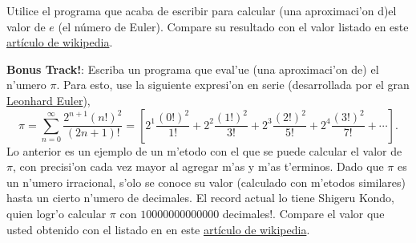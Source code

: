 \documentclass[11pt]{exam}
\begin{document}
\begin{questions}
\item Utilice el programa que acaba de escribir para calcular (una aproximaci'on d)el valor de $e$ (el n\'umero de Euler). Compare su resultado con el valor listado en este \href{https://es.wikipedia.org/wiki/N\%C3\%BAmero_e}{art\'iculo de wikipedia}.

\item \textbf{Bonus Track!}: Escriba un programa que eval'ue (una aproximaci'on de) el n'umero $\pi$. Para esto, use la siguiente expresi'on en serie (desarrollada por el gran \href{https://es.wikipedia.org/wiki/Leonhard_Euler}{Leonhard Euler}),
\begin{equation}
\pi = \sum_{n=0}^{\infty}\frac{2^{n+1}(n!)^2}{(2n+1)!}=\left[2^1\frac{(0!)^2}{1!} + 2^2\frac{(1!)^2}{3!} + 2^3\frac{(2!)^2}{5!} + 2^4 \frac{(3!)^2}{7!} + \cdots \right].
\end{equation}
Lo anterior es un ejemplo de un m'etodo con el que se puede calcular el valor de $\pi$, con precisi'on cada vez mayor al agregar m'as y m'as t'erminos. Dado que $\pi$ es un n'umero irracional, s'olo se conoce su valor (calculado con m'etodos similares) hasta un cierto n'umero de decimales. El record actual lo tiene Shigeru Kondo, quien logr'o calcular $\pi$ con $10 000 000 000 000$ decimales!. Compare el valor que usted obtenido con el listado en en este \href{https://es.wikipedia.org/wiki/N\%C3\%BAmero_pi}{art\'iculo de wikipedia}.
\end{questions}
\end{document}
